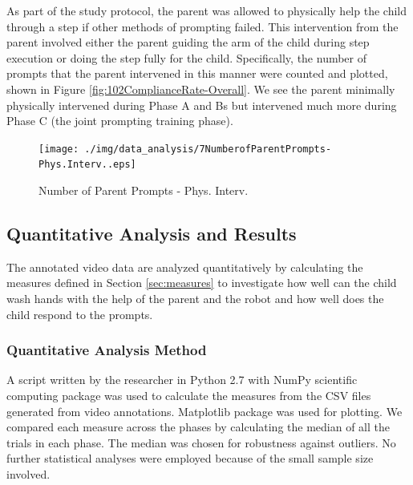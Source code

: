 As part of the study protocol, the parent was allowed to physically help the child through a step if other methods of prompting failed.  This intervention from the parent involved either the parent guiding the arm of the child during step execution or doing the step fully for the child.  Specifically, the number of prompts that the parent intervened in this manner were counted and plotted, shown in Figure \ref{fig:102ComplianceRate-Overall}.  We see the parent minimally physically intervened during Phase A and Bs but intervened much more during Phase C (the joint prompting training phase).
\begin{figure} [h]
	\centering
	\texttt{[image: ./img/data\_analysis/7NumberofParentPrompts-Phys.Interv..eps]}
	\caption{Number of Parent Prompts - Phys. Interv.}
	\label{fig:7NumberofParentPrompts-Phys.Interv.}
\end{figure}


\subsection{Quantitative Analysis and Results}
The annotated video data are analyzed quantitatively by calculating the measures defined in Section \ref{sec:measures} to investigate how well can the child wash hands with the help of the parent and the robot and how well does the child respond to the prompts.

\subsubsection{Quantitative Analysis Method}
A script written by the researcher in Python 2.7 with NumPy scientific computing package was used to calculate the measures from the CSV files generated from video annotations.  Matplotlib package was used for plotting.  We compared each measure across the phases by calculating the median of all the trials in each phase.  The median was chosen for robustness against outliers.  No further statistical analyses were employed because of the small sample size involved.

